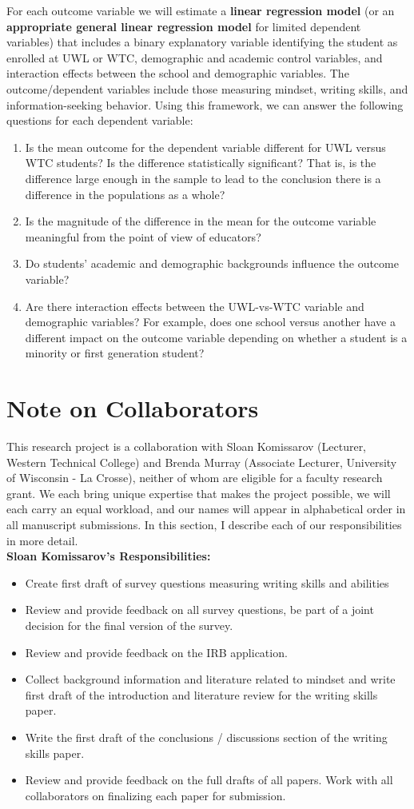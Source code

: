 \documentclass[11pt]{article}
\newcommand{\bi}{
  \begin{itemize}
  \setlength{\itemsep}{0pt}
  \setlength{\parskip}{0pt}
}
\newcommand{\ei}{\end{itemize}}
\newcommand{\be}{
  \begin{enumerate}
  \setlength{\itemsep}{0pt}
  \setlength{\parskip}{0pt}
}
\newcommand{\ee}{\end{enumerate}}
\begin{document}
For each outcome variable we will estimate a \textbf{linear regression model} (or an \textbf{appropriate general linear regression model} for limited dependent variables) that includes a binary explanatory variable identifying the student as enrolled at UWL or WTC, demographic and academic control variables, and interaction effects between the school and demographic variables.  The outcome/dependent variables include those measuring mindset, writing skills, and information-seeking behavior.  Using this framework, we can answer the following questions for each dependent variable:
\be
\item Is the mean outcome for the dependent variable different for UWL versus WTC students?  Is the difference statistically significant?  That is, is the difference large enough in the sample to lead to the conclusion there is a difference in the populations as a whole?
\item Is the magnitude of the difference in the mean for the outcome variable meaningful from the point of view of educators?
\item Do students' academic and demographic backgrounds influence the outcome variable?
\item Are there interaction effects between the UWL-vs-WTC variable and demographic variables?  For example, does one school versus another have a different impact on the outcome variable depending on whether a student is a minority or first generation student?
\ee

\section{Note on Collaborators}

This research project is a collaboration with Sloan Komissarov (Lecturer, Western Technical College) and Brenda Murray (Associate Lecturer, University of Wisconsin - La Crosse), neither of whom are eligible for a faculty research grant.  We each bring unique expertise that makes the project possible, we will each carry an equal workload, and our names will appear in alphabetical order in all manuscript submissions.  In this section, I describe each of our responsibilities in more detail.
\ \\

\noindent \textbf{Sloan Komissarov's Responsibilities:}
\bi
\item Create first draft of survey questions measuring writing skills and abilities
\item Review and provide feedback on all survey questions, be part of a joint decision for the final version of the survey.
\item Review and provide feedback on the IRB application.
\item Collect background information and literature related to mindset and write first draft of the introduction and literature review for the writing skills paper.
\item Write the first draft of the conclusions / discussions section of the writing skills paper.
\item Review and provide feedback on the full drafts of all papers.  Work with all collaborators on finalizing each paper for submission.
\ei
  
\end{document}
